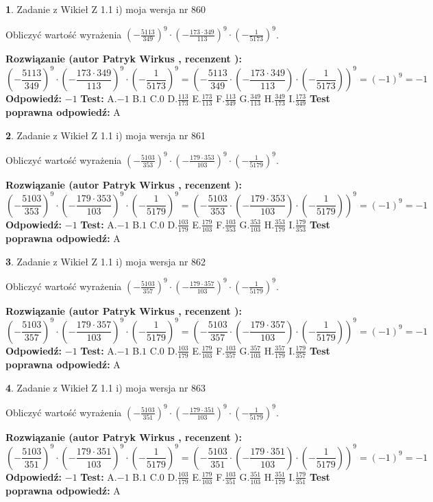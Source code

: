 \documentclass[12pt, a4paper]{article}
\theoremstyle{definition} %
\newtheorem{zad}{}
\newcommand{\zadStart}[1]{\begin{zad}#1\newline}
\newcommand{\zadStop}{\end{zad}}
\newcommand{\rozwStart}[2]{\noindent \textbf{Rozwiązanie (autor #1 , recenzent #2): }\newline}
\newcommand{\rozwStop}{\newline}
\newcommand{\odpStart}{\noindent \textbf{Odpowiedź:}\newline}
\newcommand{\odpStop}{\newline}
\newcommand{\testStart}{\noindent \textbf{Test:}\newline}
\newcommand{\testStop}{\newline}
\newcommand{\kluczStart}{\noindent \textbf{Test poprawna odpowiedź:}\newline}
\newcommand{\kluczStop}{\newline}
\begin{document}
\zadStart{Zadanie z Wikieł Z 1.1 i) moja wersja nr 860}

Obliczyć wartość wyrażenia $(-\frac{5113}{349})^{9} \cdot (-\frac{173 \cdot 349}{113})^{9} \cdot (-\frac{1}{5173})^{9}$.
\zadStop
\rozwStart{Patryk Wirkus}{}
$$(-\frac{5113}{349})^{9} \cdot (-\frac{173 \cdot 349}{113})^{9} \cdot (-\frac{1}{5173})^{9} = (-\frac{5113}{349} \cdot (-\frac{173 \cdot 349}{113}) \cdot (-\frac{1}{5173}))^{9} = (-1)^{9} = -1$$
\rozwStop
\odpStart
$-1$
\odpStop
\testStart
A.$-1$ B.$1$ C.$0$ D.$\frac{113}{173}$ E.$\frac{173}{113}$
F.$\frac{113}{349}$ G.$\frac{349}{113}$
H.$\frac{349}{173}$
I.$\frac{173}{349}$
\testStop
\kluczStart
A
\kluczStop



\zadStart{Zadanie z Wikieł Z 1.1 i) moja wersja nr 861}

Obliczyć wartość wyrażenia $(-\frac{5103}{353})^{9} \cdot (-\frac{179 \cdot 353}{103})^{9} \cdot (-\frac{1}{5179})^{9}$.
\zadStop
\rozwStart{Patryk Wirkus}{}
$$(-\frac{5103}{353})^{9} \cdot (-\frac{179 \cdot 353}{103})^{9} \cdot (-\frac{1}{5179})^{9} = (-\frac{5103}{353} \cdot (-\frac{179 \cdot 353}{103}) \cdot (-\frac{1}{5179}))^{9} = (-1)^{9} = -1$$
\rozwStop
\odpStart
$-1$
\odpStop
\testStart
A.$-1$ B.$1$ C.$0$ D.$\frac{103}{179}$ E.$\frac{179}{103}$
F.$\frac{103}{353}$ G.$\frac{353}{103}$
H.$\frac{353}{179}$
I.$\frac{179}{353}$
\testStop
\kluczStart
A
\kluczStop



\zadStart{Zadanie z Wikieł Z 1.1 i) moja wersja nr 862}

Obliczyć wartość wyrażenia $(-\frac{5103}{357})^{9} \cdot (-\frac{179 \cdot 357}{103})^{9} \cdot (-\frac{1}{5179})^{9}$.
\zadStop
\rozwStart{Patryk Wirkus}{}
$$(-\frac{5103}{357})^{9} \cdot (-\frac{179 \cdot 357}{103})^{9} \cdot (-\frac{1}{5179})^{9} = (-\frac{5103}{357} \cdot (-\frac{179 \cdot 357}{103}) \cdot (-\frac{1}{5179}))^{9} = (-1)^{9} = -1$$
\rozwStop
\odpStart
$-1$
\odpStop
\testStart
A.$-1$ B.$1$ C.$0$ D.$\frac{103}{179}$ E.$\frac{179}{103}$
F.$\frac{103}{357}$ G.$\frac{357}{103}$
H.$\frac{357}{179}$
I.$\frac{179}{357}$
\testStop
\kluczStart
A
\kluczStop



\zadStart{Zadanie z Wikieł Z 1.1 i) moja wersja nr 863}

Obliczyć wartość wyrażenia $(-\frac{5103}{351})^{9} \cdot (-\frac{179 \cdot 351}{103})^{9} \cdot (-\frac{1}{5179})^{9}$.
\zadStop
\rozwStart{Patryk Wirkus}{}
$$(-\frac{5103}{351})^{9} \cdot (-\frac{179 \cdot 351}{103})^{9} \cdot (-\frac{1}{5179})^{9} = (-\frac{5103}{351} \cdot (-\frac{179 \cdot 351}{103}) \cdot (-\frac{1}{5179}))^{9} = (-1)^{9} = -1$$
\rozwStop
\odpStart
$-1$
\odpStop
\testStart
A.$-1$ B.$1$ C.$0$ D.$\frac{103}{179}$ E.$\frac{179}{103}$
F.$\frac{103}{351}$ G.$\frac{351}{103}$
H.$\frac{351}{179}$
I.$\frac{179}{351}$
\testStop
\kluczStart
A
\kluczStop
\end{document}
